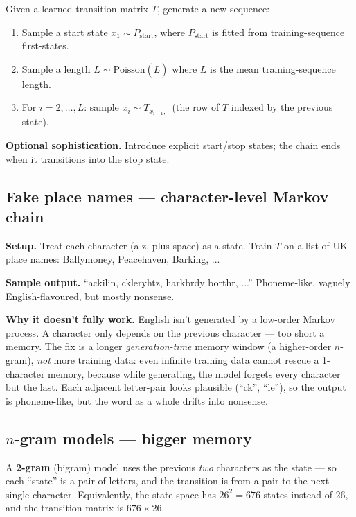 \documentclass[11pt, a4paper]{article}
\begin{document}
Given a learned transition matrix $T$, generate a new sequence:
\begin{enumerate}
  \item Sample a start state $x_1 \sim P_{\text{start}}$, where $P_{\text{start}}$ is fitted from training-sequence first-states.
  \item Sample a length $L \sim \text{Poisson}(\bar L)$ where $\bar L$ is the mean training-sequence length.
  \item For $i = 2, \ldots, L$: sample $x_i \sim T_{x_{i-1}, \cdot}$ (the row of $T$ indexed by the previous state).
\end{enumerate}

\textbf{Optional sophistication.} Introduce explicit start/stop states; the chain ends when it transitions into the stop state.

\subsection{Fake place names --- character-level Markov chain}

\textbf{Setup.} Treat each character (a-z, plus space) as a state. Train $T$ on a list of UK place names: Ballymoney, Peacehaven, Barking, ...

\textbf{Sample output.} ``ackilin, ckleryhtz, harkbrdy borthr, ...'' Phoneme-like, vaguely English-flavoured, but mostly nonsense.

\textbf{Why it doesn't fully work.} English isn't generated by a low-order Markov process. A character only depends on the previous character — too short a memory. The fix is a longer \emph{generation-time} memory window (a higher-order $n$-gram), \emph{not} more training data: even infinite training data cannot rescue a 1-character memory, because while generating, the model forgets every character but the last. Each adjacent letter-pair looks plausible (``ck'', ``le''), so the output is phoneme-like, but the word as a whole drifts into nonsense.

\subsection{$n$-gram models --- bigger memory}

A \textbf{2-gram} (bigram) model uses the previous \emph{two} characters as the state — so each ``state'' is a pair of letters, and the transition is from a pair to the next single character. Equivalently, the state space has $26^2 = 676$ states instead of 26, and the transition matrix is $676 \times 26$.
\end{document}
